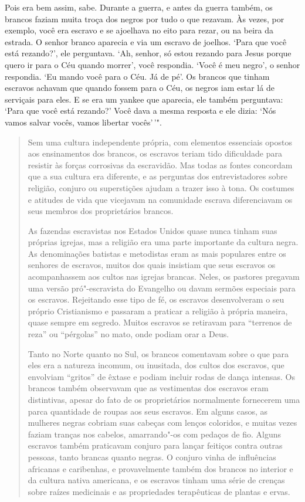 Pois era bem assim, sabe. Durante a guerra, e antes da guerra também, os
brancos faziam muita troça dos negros por tudo o que rezavam. Às vezes,
por exemplo, você era escravo e se ajoelhava no eito para rezar, ou na
beira da estrada. O senhor branco aparecia e via um escravo de joelhos.
`Para que você está rezando?', ele perguntava. `Ah, senhor, só estou
rezando para Jesus porque quero ir para o Céu quando morrer', você
respondia. `Você é meu negro', o senhor respondia. `Eu mando você
para o Céu. Já de pé'. Os brancos que tinham escravos achavam que
quando fossem para o Céu, os negros iam estar lá de serviçais para eles.
E se era um yankee que aparecia, ele também perguntava: `Para que você
está rezando?' Você dava a mesma resposta e ele dizia: `Nós vamos
salvar vocês, vamos libertar vocês'\,'".

\begin{quote}
Sem uma cultura independente própria, com elementos essenciais
opostos aos ensinamentos dos brancos, os escravos teriam tido
dificuldade para resistir às forças corrosivas da escravidão. Mas todas
as fontes concordam que a sua cultura era diferente, e as perguntas dos
entrevistadores sobre religião, conjuro ou superstições ajudam a trazer
isso à tona. Os costumes e atitudes de vida que vicejavam na comunidade
escrava diferenciavam os seus membros dos proprietários brancos.

As fazendas escravistas nos Estados Unidos quase nunca tinham suas
próprias igrejas, mas a religião era uma parte importante da cultura
negra. As denominações batistas e metodistas eram as mais populares
entre os senhores de escravos, muitos dos quais insistiam que seus
escravos os acompanhassem aos cultos nas igrejas brancas. Neles, os
pastores pregavam uma versão pró"-escravista do Evangelho ou davam
sermões especiais para os escravos. Rejeitando esse tipo de fé, os
escravos desenvolveram o seu próprio Cristianismo e passaram a praticar
a religião à própria maneira, quase sempre em segredo. Muitos escravos
se retiravam para ``terrenos de reza'' ou ``pérgolas'' no mato, onde
podiam orar a Deus.

Tanto no Norte quanto no Sul, os brancos comentavam sobre o que
para eles era a natureza incomum, ou inusitada, dos cultos dos escravos,
que envolviam ``gritos'' de êxtase e podiam incluir rodas de dança
intensas. Os brancos também observavam que as vestimentas dos escravos
eram distintivas, apesar do fato de os proprietários normalmente
fornecerem uma parca quantidade de roupas aos seus escravos. Em alguns
casos, as mulheres negras cobriam suas cabeças com lenços coloridos, e
muitas vezes faziam tranças nos cabelos, amarrando"-os com pedaços de
fio. Alguns escravos também praticavam conjuro para lançar feitiços
contra outras pessoas, tanto brancas quanto negras. O conjuro vinha de
influências africanas e caribenhas, e provavelmente também dos brancos
no interior e da cultura nativa americana, e os escravos tinham uma
série de crenças sobre raízes medicinais e as propriedades terapêuticas
de plantas e ervas.


\end{quote}
